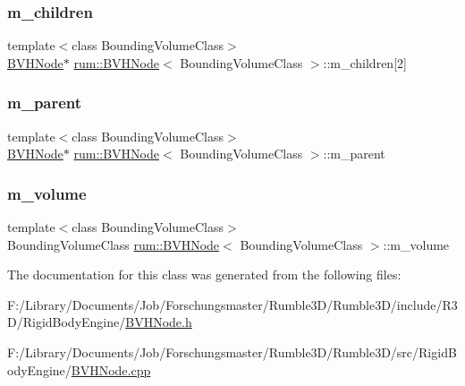 \subsubsection{\texorpdfstring{m\+\_\+children}{m\_children}}
{\footnotesize\ttfamily template$<$class Bounding\+Volume\+Class$>$ \\
\hyperlink{classrum_1_1_b_v_h_node}{B\+V\+H\+Node}$\ast$ \hyperlink{classrum_1_1_b_v_h_node}{rum\+::\+B\+V\+H\+Node}$<$ Bounding\+Volume\+Class $>$\+::m\+\_\+children\mbox{[}2\mbox{]}\hspace{0.3cm}{\ttfamily [protected]}}

\mbox{\label{classrum_1_1_b_v_h_node_ae69483db4fada9afde3a31393243a87d}} 
\subsubsection{\texorpdfstring{m\+\_\+parent}{m\_parent}}
{\footnotesize\ttfamily template$<$class Bounding\+Volume\+Class$>$ \\
\hyperlink{classrum_1_1_b_v_h_node}{B\+V\+H\+Node}$\ast$ \hyperlink{classrum_1_1_b_v_h_node}{rum\+::\+B\+V\+H\+Node}$<$ Bounding\+Volume\+Class $>$\+::m\+\_\+parent\hspace{0.3cm}{\ttfamily [protected]}}

\mbox{\label{classrum_1_1_b_v_h_node_aae21162bff289e2d0d502c9360d0f36c}} 
\subsubsection{\texorpdfstring{m\+\_\+volume}{m\_volume}}
{\footnotesize\ttfamily template$<$class Bounding\+Volume\+Class$>$ \\
Bounding\+Volume\+Class \hyperlink{classrum_1_1_b_v_h_node}{rum\+::\+B\+V\+H\+Node}$<$ Bounding\+Volume\+Class $>$\+::m\+\_\+volume\hspace{0.3cm}{\ttfamily [protected]}}



The documentation for this class was generated from the following files\+:\begin{DoxyCompactItemize}
\item 
F\+:/\+Library/\+Documents/\+Job/\+Forschungsmaster/\+Rumble3\+D/\+Rumble3\+D/include/\+R3\+D/\+Rigid\+Body\+Engine/\hyperlink{_b_v_h_node_8h}{B\+V\+H\+Node.\+h}\item 
F\+:/\+Library/\+Documents/\+Job/\+Forschungsmaster/\+Rumble3\+D/\+Rumble3\+D/src/\+Rigid\+Body\+Engine/\hyperlink{_b_v_h_node_8cpp}{B\+V\+H\+Node.\+cpp}\end{DoxyCompactItemize}
